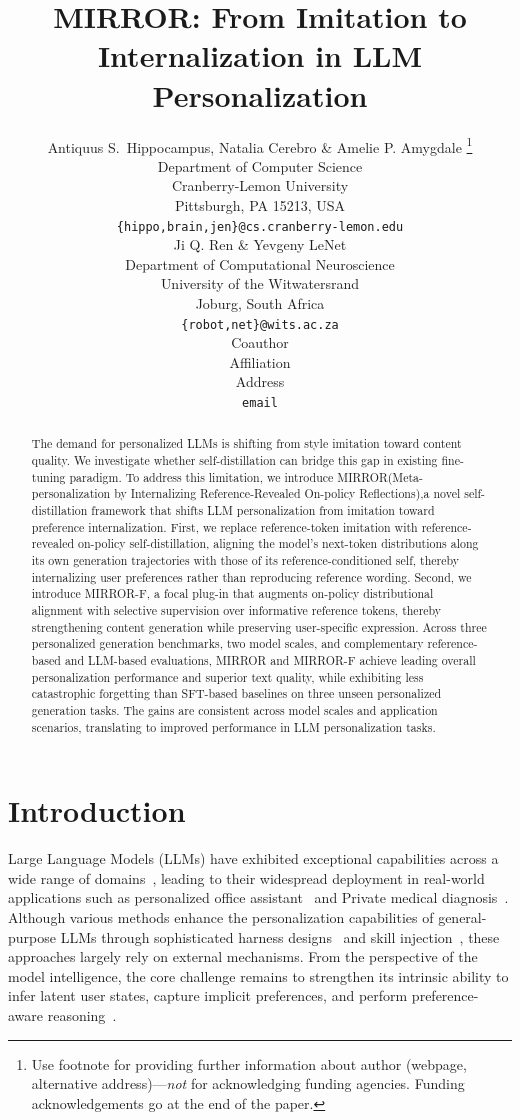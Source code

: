 \documentclass{article} %
\title{MIRROR: From Imitation to Internalization in LLM Personalization}
\author{Antiquus S.~Hippocampus, Natalia Cerebro \& Amelie P. Amygdale \thanks{ Use footnote for providing further information
about author (webpage, alternative address)---\emph{not} for acknowledging
funding agencies.  Funding acknowledgements go at the end of the paper.} \\
Department of Computer Science\\
Cranberry-Lemon University\\
Pittsburgh, PA 15213, USA \\
\texttt{\{hippo,brain,jen\}@cs.cranberry-lemon.edu} \\
\And
Ji Q. Ren \& Yevgeny LeNet \\
Department of Computational Neuroscience \\
University of the Witwatersrand \\
Joburg, South Africa \\
\texttt{\{robot,net\}@wits.ac.za} \\
\AND
Coauthor \\
Affiliation \\
Address \\
\texttt{email}
}
\begin{document}
\maketitle

\begin{abstract}
The demand for personalized LLMs is shifting from style imitation toward content quality. We investigate whether self-distillation can bridge this gap in existing fine-tuning paradigm. 
To address this limitation, we introduce MIRROR(Meta-
personalization by Internalizing Reference-Revealed On-policy Reflections),a novel self-distillation framework that shifts LLM personalization from imitation toward preference internalization. 
First, we replace reference-token imitation with reference-revealed on-policy self-distillation, aligning the model’s next-token distributions along its own generation trajectories with those of its reference-conditioned self, thereby internalizing user preferences rather than reproducing reference wording.
Second, we introduce MIRROR-F, a focal plug-in that augments on-policy distributional alignment with selective supervision over informative reference tokens, thereby strengthening content generation while preserving user-specific expression.
Across three personalized generation benchmarks, two model scales, and complementary reference-based and LLM-based evaluations, MIRROR and MIRROR-F achieve leading overall personalization performance and superior text quality, while exhibiting less catastrophic forgetting than SFT-based baselines on three unseen personalized generation tasks.
The gains are consistent across model scales and application scenarios, translating to improved performance in LLM personalization tasks. 
\end{abstract}

\section{Introduction}
\label{Introduction}
Large Language Models (LLMs) have exhibited exceptional capabilities across a wide range of domains~\citep{kimik3,qwen3}, leading to their widespread deployment in real-world applications such as personalized office assistant~\citep{office1,office2} and Private medical diagnosis~\citep{hospital}.
Although various methods enhance the personalization capabilities of general-purpose LLMs through sophisticated harness designs~\citep{harness} and skill injection~\citep{skill}, these approaches largely rely on external mechanisms. From the perspective of the model intelligence, the core challenge remains to strengthen its intrinsic ability to infer latent user states, capture implicit preferences, and perform preference-aware reasoning~\citep{antiharness,antiharness2,antiharness3}.
\end{document}
